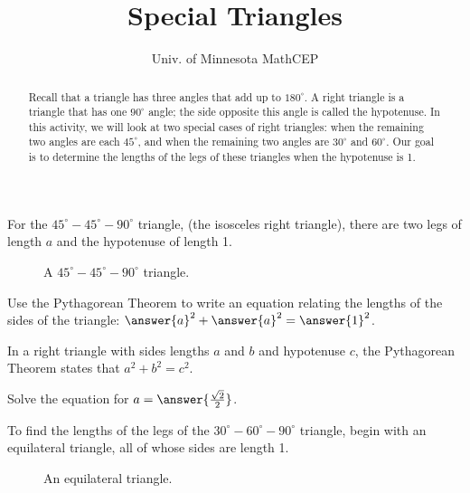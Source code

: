 \documentclass[number]{ximera}
\title{Special Triangles}
\author{Univ. of Minnesota MathCEP}
\begin{document}
\begin{abstract}
Recall that a triangle has three angles that add up to $180^\circ$.
A right triangle is a triangle that has one $90^\circ$ angle; the side opposite this angle is called the hypotenuse.
In this activity, we will look at two special cases of right triangles: when the remaining two angles are each $45^\circ$, and when the remaining two angles are $30^\circ$ and $60^\circ$.
Our goal is to determine the lengths of the legs of these triangles when the hypotenuse is 1.
\end{abstract}

\maketitle

For the $45^\circ-45^\circ-90^\circ$ triangle, (the isosceles right triangle), there are two legs of length $a$
and the hypotenuse of length 1.

\begin{figure}[h!]
\caption{A $45^\circ-45^\circ-90^\circ$ triangle.}
\end{figure}


\begin{problem}
Use the Pythagorean Theorem to write an equation relating the lengths of the sides of the triangle: $\answer{a}^2+\answer{a}^2=\answer{1}^2$.
\begin{hint}
In a right triangle with sides lengths $a$ and $b$ and hypotenuse $c$, the Pythagorean Theorem states that $a^2+b^2=c^2$.
\end{hint}

\end{problem}

\begin{problem}
Solve the equation for $a = \answer{\frac{\sqrt{2}}{2}}$.
\end{problem}

To find the lengths of the legs of the $30^\circ-60^\circ-90^\circ$ triangle, begin with an equilateral triangle, all of whose sides are length 1.

\begin{figure}[h!]
\caption{An equilateral triangle.}
\end{figure}
\end{document}
